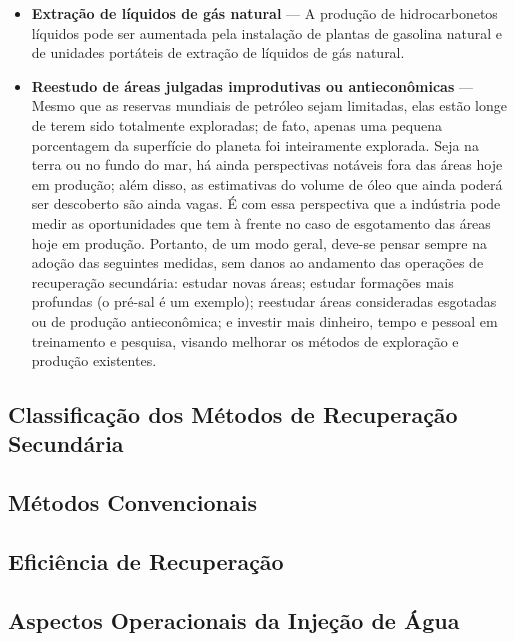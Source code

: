 \begin{itemize}
\item \textbf{Extração de líquidos de gás natural} --- A produção de hidrocarbonetos líquidos pode ser aumentada pela instalação de plantas de gasolina natural e de unidades portáteis de extração de líquidos de gás natural.
\item \textbf{Reestudo de áreas julgadas improdutivas ou antieconômicas} --- Mesmo que as reservas mundiais de petróleo sejam limitadas, elas estão longe de terem sido totalmente exploradas; de fato, apenas uma pequena porcentagem da superfície do planeta foi inteiramente explorada. Seja na terra ou no fundo do mar, há ainda perspectivas notáveis fora das áreas hoje em produção; além disso, as estimativas do volume de óleo que ainda poderá ser descoberto são ainda vagas. É com essa perspectiva que a indústria pode medir as oportunidades que tem à frente no caso de esgotamento das áreas hoje em produção. Portanto, de um modo geral, deve-se pensar sempre na adoção das seguintes medidas, sem danos ao andamento das operações de recuperação secundária: estudar novas áreas; estudar formações mais profundas (o pré-sal é um exemplo); reestudar áreas consideradas esgotadas ou de produção antieconômica; e investir mais dinheiro, tempo e pessoal em treinamento e pesquisa, visando melhorar os métodos de exploração e produção existentes.
\end{itemize}

\subsection{Classificação dos Métodos de Recuperação Secundária}

\subsection{Métodos Convencionais}

\subsection{Eficiência de Recuperação}

\subsection{Aspectos Operacionais da Injeção de Água}